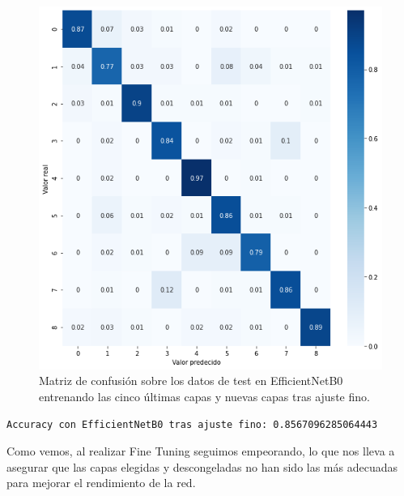 \begin{figure}[H]
  \centering
  \includegraphics[width=0.5\linewidth]{Imagenes/entrenamiento_redes/5-ult/efficientnet_5fine_matriz.png}
  \caption{Matriz de confusión sobre los datos de test en EfficientNetB0 entrenando las cinco últimas capas y nuevas capas tras ajuste fino.}
\end{figure}


\begin{lstlisting}
Accuracy con EfficientNetB0 tras ajuste fino: 0.8567096285064443
\end{lstlisting}


Como vemos, al realizar Fine Tuning seguimos empeorando, lo que nos lleva a asegurar que las capas elegidas y descongeladas no han sido las más adecuadas para mejorar el rendimiento de la red.